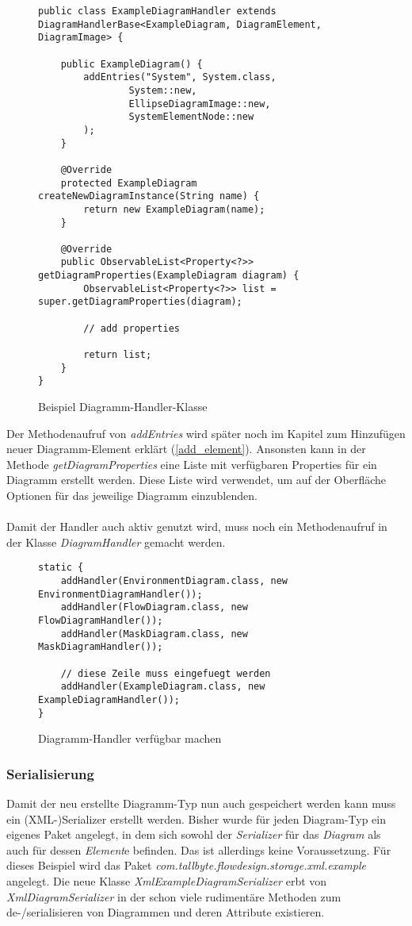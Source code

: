 \begin{figure}[H]
	\centering
	\begin{lstlisting}
public class ExampleDiagramHandler extends DiagramHandlerBase<ExampleDiagram, DiagramElement, DiagramImage> {

    public ExampleDiagram() {
        addEntries("System", System.class,
                System::new,
                EllipseDiagramImage::new,
                SystemElementNode::new
        );
    }

    @Override
    protected ExampleDiagram createNewDiagramInstance(String name) {
        return new ExampleDiagram(name);
    }
    
    @Override
    public ObservableList<Property<?>> getDiagramProperties(ExampleDiagram diagram) {
        ObservableList<Property<?>> list = super.getDiagramProperties(diagram);

		// add properties

        return list;
    }
}
	\end{lstlisting}
	\label{diagram_handler}
	\caption{Beispiel Diagramm-Handler-Klasse}
\end{figure}
Der Methodenaufruf von \textit{addEntries} wird später noch im Kapitel zum Hinzufügen neuer Diagramm-Element
erklärt (\ref{add_element}). Ansonsten kann in der Methode \textit{getDiagramProperties} eine Liste mit verfügbaren
Properties für ein Diagramm erstellt werden. Diese Liste wird verwendet, um auf der Oberfläche Optionen für das
jeweilige Diagramm einzublenden.
\\
\\
Damit der Handler auch aktiv genutzt wird, muss noch ein Methodenaufruf in der Klasse \textit{DiagramHandler} gemacht
werden.

\begin{figure}[H]
	\centering
	\begin{lstlisting}
static {
    addHandler(EnvironmentDiagram.class, new EnvironmentDiagramHandler());
    addHandler(FlowDiagram.class, new FlowDiagramHandler());
    addHandler(MaskDiagram.class, new MaskDiagramHandler());
        
    // diese Zeile muss eingefuegt werden
    addHandler(ExampleDiagram.class, new ExampleDiagramHandler());
}
	\end{lstlisting}
	\label{diagram_handler}
	\caption{Diagramm-Handler verfügbar machen}
\end{figure}
\subsubsection{Serialisierung}
Damit der neu erstellte Diagramm-Typ nun auch gespeichert werden kann muss ein (XML-)Serializer erstellt
werden. Bisher wurde für jeden Diagram-Typ ein eigenes Paket angelegt, in dem sich sowohl der 
\textit{Serializer} für das \textit{Diagram} als auch für dessen \textit{Element}e befinden. Das ist
allerdings keine Voraussetzung. 
Für dieses Beispiel wird das Paket \textit{com.tallbyte.flowdesign.storage.xml.example} angelegt.
Die neue Klasse \textit{XmlExampleDiagramSerializer} erbt von \textit{XmlDiagramSerializer} in der
schon viele rudimentäre Methoden zum de-/serialisieren von Diagrammen und deren Attribute existieren.

